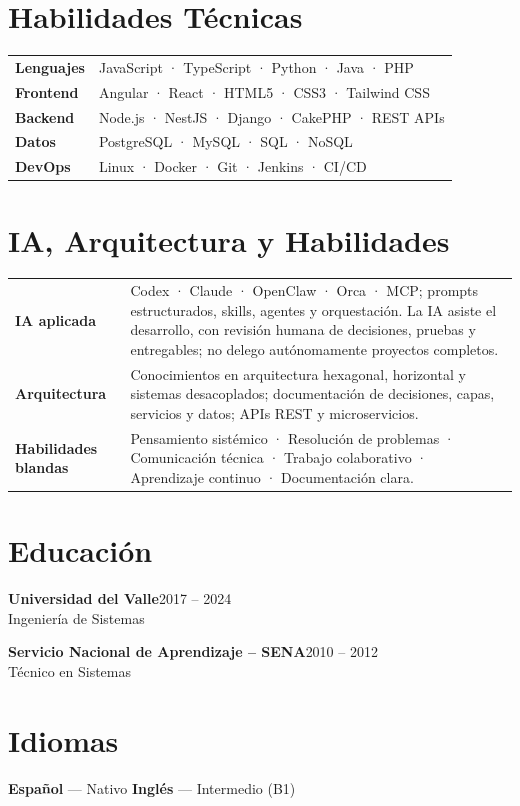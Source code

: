 \documentclass[10pt,a4paper]{article}
\begin{document}
\section{Habilidades Técnicas}
\begin{tabularx}{\textwidth}{@{}>{\bfseries}l X@{}}
Lenguajes & JavaScript · TypeScript · Python · Java · PHP \\
Frontend & Angular · React · HTML5 · CSS3 · Tailwind CSS \\
Backend & Node.js · NestJS · Django · CakePHP · REST APIs \\
Datos & PostgreSQL · MySQL · SQL · NoSQL \\
DevOps & Linux · Docker · Git · Jenkins · CI/CD
\end{tabularx}

\section{IA, Arquitectura y Habilidades}
\begin{tabularx}{\textwidth}{@{}>{\bfseries}l X@{}}
IA aplicada & Codex · Claude · OpenClaw · Orca · MCP; prompts estructurados, skills, agentes y orquestación. La IA asiste el desarrollo, con revisión humana de decisiones, pruebas y entregables; no delego autónomamente proyectos completos. \\
Arquitectura & Conocimientos en arquitectura hexagonal, horizontal y sistemas desacoplados; documentación de decisiones, capas, servicios y datos; APIs REST y microservicios. \\
Habilidades blandas & Pensamiento sistémico · Resolución de problemas · Comunicación técnica · Trabajo colaborativo · Aprendizaje continuo · Documentación clara.
\end{tabularx}

\section{Educación}
\textbf{Universidad del Valle}\hfill{\small\color{muted}2017 -- 2024}\\
Ingeniería de Sistemas
\vspace{3pt}

\textbf{Servicio Nacional de Aprendizaje -- SENA}\hfill{\small\color{muted}2010 -- 2012}\\
Técnico en Sistemas

\section{Idiomas}
\textbf{Español} — Nativo
\qquad
\textbf{Inglés} — Intermedio (B1)
\end{document}
